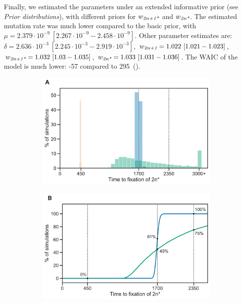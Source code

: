 \documentclass[12pt]{extarticle}
\newcommand{\anwt}{\emph{2n+1}}
\newcommand{\eumt}{\emph{2n*}}
\newcommand{\anmt}{\emph{2n+1*}}
\begin{document}
Finally, we estimated the parameters under an extended informative prior (see \emph{Prior distributions}), with different priors for $w_{\anmt}$ and $w_{\eumt}$. The estimated mutation rate was much lower compared to the basic prior, with $\mu=2.379\cdot10^{-9}\ [2.267\cdot10^{-9}-2.458\cdot10^{-9}]$. Other parameter estimates are: $\delta=2.636\cdot10^{-3}\ [2.245\cdot10^{-3}-2.919\cdot10^{-3}]$,
$w_{\anwt}=1.022\ [1.021-1.023]$,
$w_{\anmt}=1.032\ [1.03-1.035]$,
$w_{\eumt}=1.033\ [1.031-1.036]$. 
The WAIC of the model is much lower: -57 compared to 295~().

\begin{figure}[p]
  \begin{subfigure}{0.5\textwidth}
      \centering
      \includegraphics[width=\textwidth]{../figures/fixation-plot-a.pdf}      
      \label{fig:fit}
  \end{subfigure}
  \begin{subfigure}{0.5\textwidth}
      \centering
      \includegraphics[width=\textwidth]{../figures/fixation-plot-b.pdf}      

\end{subfigure}
\end{figure}
\end{document}
